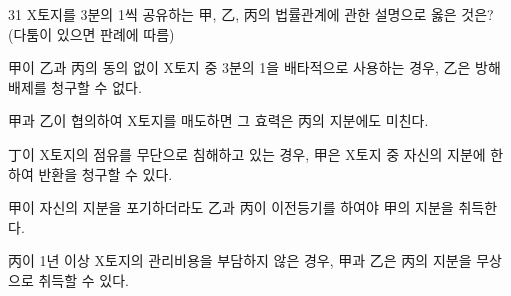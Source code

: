 \begin{question}{31}
X토지를 3분의 1씩 공유하는 甲, 乙, 丙의 법률관계에 관한 설명으로 옳은 것은? (다툼이 있으면 판례에 따름)
\begin{choices}
  \item 甲이 乙과 丙의 동의 없이 X토지 중 3분의 1을 배타적으로 사용하는 경우, 乙은 방해배제를 청구할 수 없다.
  \item 甲과 乙이 협의하여 X토지를 매도하면 그 효력은 丙의 지분에도 미친다.
  \item 丁이 X토지의 점유를 무단으로 침해하고 있는 경우, 甲은 X토지 중 자신의 지분에 한하여 반환을 청구할 수 있다.
  \item 甲이 자신의 지분을 포기하더라도 乙과 丙이 이전등기를 하여야 甲의 지분을 취득한다.
  \item 丙이 1년 이상 X토지의 관리비용을 부담하지 않은 경우, 甲과 乙은 丙의 지분을 무상으로 취득할 수 있다.
\end{choices}
\end{question}
